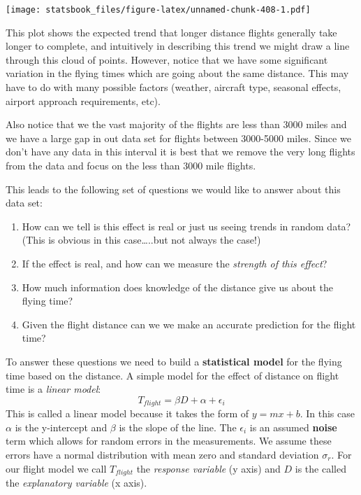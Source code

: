 \documentclass[
]{book}
\newenvironment{Shaded}{\begin{snugshade}}{\end{snugshade}}
\newcommand{\DecValTok}[1]{\textcolor[rgb]{0.00,0.00,0.81}{#1}}
\newcommand{\FunctionTok}[1]{\textcolor[rgb]{0.00,0.00,0.00}{#1}}
\newcommand{\NormalTok}[1]{#1}
\newcommand{\OtherTok}[1]{\textcolor[rgb]{0.56,0.35,0.01}{#1}}
\newcommand{\SpecialCharTok}[1]{\textcolor[rgb]{0.00,0.00,0.00}{#1}}
\theoremstyle{definition}
\theoremstyle{definition}
\theoremstyle{definition}
\theoremstyle{definition}
\theoremstyle{remark}
\begin{document}
\texttt{[image: statsbook\_files/figure-latex/unnamed-chunk-408-1.pdf]}

This plot shows the expected trend that longer distance flights generally take longer to complete, and intuitively in describing this trend we might draw a line through this cloud of points. However, notice that we have some significant variation in the flying times which are going about the same distance. This may have to do with many possible factors (weather, aircraft type, seasonal effects, airport approach requirements, etc).

Also notice that we the vast majority of the flights are less than 3000 miles and we have a large gap in out data set for flights between 3000-5000 miles. Since we don't have any data in this interval it is best that we remove the very long flights from the data and focus on the less than 3000 mile flights.

\begin{Shaded}
\end{Shaded}

This leads to the following set of questions we would like to answer about this data set:

\begin{enumerate}
\def\labelenumi{\arabic{enumi}.}
\item
  How can we tell is this effect is real or just us seeing trends in random data? (This is obvious in this case\ldots..but not always the case!)
\item
  If the effect is real, and how can we measure the \emph{strength of this effect}?
\item
  How much information does knowledge of the distance give us about the flying time?
\item
  Given the flight distance can we we make an accurate prediction for the flight time?
\end{enumerate}

To answer these questions we need to build a \textbf{statistical model} for the flying time based on the distance. A simple model for the effect of distance on flight time is a \emph{linear model}: \[T_{flight}=\beta D+\alpha+\epsilon_i\] This is called a linear model because it takes the form of \(y=mx+b\). In this case \(\alpha\) is the y-intercept and \(\beta\) is the slope of the line. The \(\epsilon_i\) is an assumed \textbf{noise} term which allows for random errors in the measurements. We assume these errors have a normal distribution with mean zero and standard deviation \(\sigma_r\). For our flight model we call \(T_{flight}\) the \emph{response variable} (y axis) and \(D\) is the called the \emph{explanatory variable} (x axis).
\end{document}
